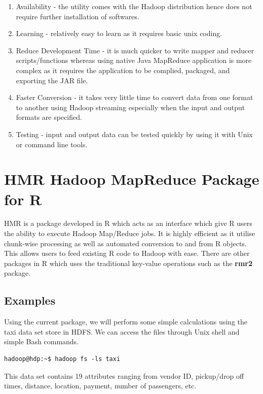 \documentclass[11pt]{book}
\newcommand{\pkg}[1]{\textsf{ \bf #1}}
\begin{document}
\begin{enumerate}
\item Availability - the utility comes with the Hadoop distribution hence does not require further installation of softwares.
\item Learning - relatively easy to learn as it requires basic unix coding.
\item Reduce Development Time - it is much quicker to write mapper and reducer scripts/functions whereas using native Java MapReduce application is more complex as it requires the application to be complied, packaged, and exporting the JAR file.
\item Faster Conversion - it takes very little time to convert data from one format to another using Hadoop streaming especially when the input and output formats are specified.
\item Testing - input and output data can be tested quickly by using it with Unix or command line tools.
\end{enumerate}

\chapter{HMR Hadoop MapReduce Package for R}

HMR is a package developed in R which acts as an interface which give R users the ability to execute Hadoop Map/Reduce jobs. It is highly efficient as it utilise chunk-wise processing as well as automated conversion to and from R objects. This allows users to feed existing R code to Hadoop with ease. There are other packages in R which uses the traditional key-value operations such as the \pkg{rmr2} package.

\section{Examples}

Using the current package, we will perform some simple calculations using the taxi data set store in HDFS. We can access the files through Unix shell and simple Bash commands.

\begin{verbatim}
hadoop@hdp:~$ hadoop fs -ls taxi
\end{verbatim}

This data set contains 19 attributes ranging from vendor ID, pickup/drop off times, distance, location, payment, number of passengers, etc. \\
\end{document}
